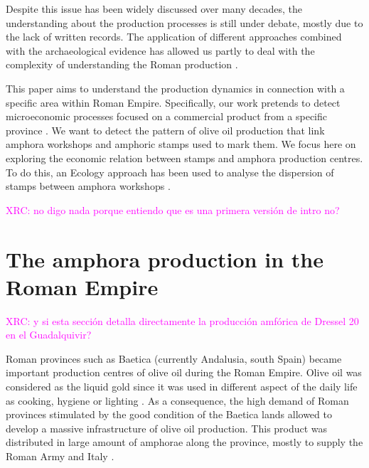 \documentclass[review]{elsarticle}
\newcommand{\memo}[2]{\textcolor{#1}{#2}}
\newcommand{\xavi}[1]{\memo{magenta}{XRC: #1\\}}
\begin{document}
Despite this issue has been widely discussed over many decades, the understanding about the production processes is still under debate, mostly due to the lack of written records. The application of different approaches combined with the archaeological evidence has allowed us partly to deal with the complexity of understanding the Roman production \citep{orengo_seeds_2016,brughmans_roman_2016,coto-sarmiento_maria_bayesian_????}.

This paper aims to understand the production dynamics in connection with a specific area within Roman Empire. Specifically, our work pretends to detect microeconomic processes focused on a commercial product from a specific province \citep{isaksen_network_2006}. We want to detect the pattern of olive oil production that link amphora workshops and amphoric stamps used to mark them. We focus here on exploring the economic relation between stamps and amphora production centres. To do this, an Ecology approach has been used to analyse the dispersion of stamps between amphora workshops \citep{rubio-campillo_ecology_2018}. 


 

\xavi{no digo nada porque entiendo que es una primera versión de intro no?}

\section{The amphora production in the Roman Empire}

\xavi{y si esta sección detalla directamente la producción amfórica de Dressel 20 en el Guadalquivir?}

Roman provinces such as Baetica (currently Andalusia, south Spain) became important production centres of olive oil during the Roman Empire. Olive oil was considered as the liquid gold since it was used in different aspect of the daily life as cooking, hygiene or lighting  \citep{mattingly_d.j._oil_1988}. As a consequence, the high demand of Roman provinces stimulated by the good condition of the Baetica lands allowed to develop a massive infrastructure of olive oil production. This product was distributed in large amount of amphorae along the province, mostly to supply the Roman Army and Italy \citep{blazquez_exportacion_1980}. 
\end{document}
